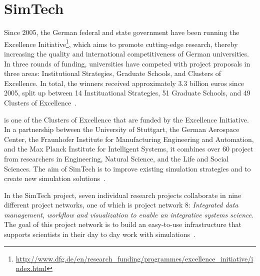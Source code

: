 \section{SimTech}

Since 2005, the German federal and state government have been running the Excellence Initiative\footnote{\url{http://www.dfg.de/en/research_funding/programmes/excellence_initiative/index.html}}, which aims to promote cutting-edge research, thereby increasing the quality and international competitiveness of German universities.
In three rounds of funding, universities have competed with project proposals in three areas: Institutional Strategies, Graduate Schools, and Clusters of Excellence.
In total, the winners received approximately 3.3 billion euros since 2005, split up between 14 Instituational Strategies, 51 Graduate Schools, and 49 Clusters of Excellence~\autocite[pp.~16-18]{excellence:glance}.

 is one of the Clusters of Excellence that are funded by the Excellence Initiative.
In a partnership between the University of Stuttgart, the German Aerospace Center, the Fraunhofer Institute for Manufacturing Engineering and Automation, and the Max Planck Institute for Intelligent Systems, it combines over 60 project from researchers in Engineering, Natural Science, and the Life and Social Sciences.
The aim of SimTech is to improve existing simulation strategies and to create new simulation solutions~\autocite[pp.~109]{excellence:glance}.

In the SimTech project, seven individual research projects collaborate in nine different project networks, one of which is project network 8: \textit{Integrated data management, workflow and visualization to enable an integrative systems science}.
The goal of this project network is to build an easy-to-use infrastructure that supports scientists in their day to day work with simulations~\autocite{simtech:projectnetwork8}.
